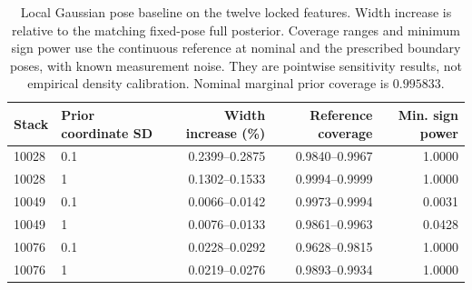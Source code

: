 \begin{table}[t]
\centering
\caption{Local Gaussian pose baseline on the twelve locked features. Width increase is relative to the matching fixed-pose full posterior. Coverage ranges and minimum sign power use the continuous reference at nominal and the prescribed boundary poses, with known measurement noise. They are pointwise sensitivity results, not empirical density calibration. Nominal marginal prior coverage is $0.995833$.}
\label{tab:fourier-pose}
\begin{tabular}{llrrr}
\toprule
Stack & Prior coordinate SD & Width increase (\%) & Reference coverage & Min. sign power\\
\midrule
10028 & 0.1 & 0.2399--0.2875 & 0.9840--0.9967 & 1.0000\\
10028 & 1 & 0.1302--0.1533 & 0.9994--0.9999 & 1.0000\\
10049 & 0.1 & 0.0066--0.0142 & 0.9973--0.9994 & 0.0031\\
10049 & 1 & 0.0076--0.0133 & 0.9861--0.9963 & 0.0428\\
10076 & 0.1 & 0.0228--0.0292 & 0.9628--0.9815 & 1.0000\\
10076 & 1 & 0.0219--0.0276 & 0.9893--0.9934 & 1.0000\\
\bottomrule
\end{tabular}
\end{table}
